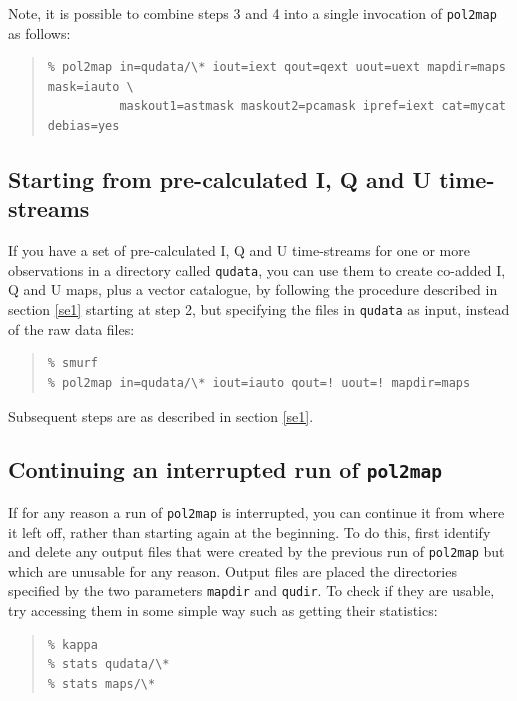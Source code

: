 \documentclass[twoside,11pt]{starlink}
\begin{document}
\begin{description}
\begin{quote}
\begin{verbatim}
\end{verbatim}
\end{quote}

Note, it is possible to combine steps 3 and 4 into a single invocation of
\texttt{pol2map} as follows:

\begin{quote}
\begin{verbatim}
% pol2map in=qudata/\* iout=iext qout=qext uout=uext mapdir=maps mask=iauto \
          maskout1=astmask maskout2=pcamask ipref=iext cat=mycat debias=yes
\end{verbatim}
\end{quote}



\end{description}

\subsection{Starting from pre-calculated I, Q and U time-streams}
If you have a set of pre-calculated I, Q and U time-streams for one or
more observations in a directory called \texttt{qudata}, you can use them
to create co-added  I, Q and U maps, plus a vector catalogue, by
following the procedure described in section \ref{se1} starting at step
2, but specifying the files in \texttt{qudata} as input, instead of the
raw data files:
\begin{quote}
\begin{verbatim}
% smurf
% pol2map in=qudata/\* iout=iauto qout=! uout=! mapdir=maps
\end{verbatim}
\end{quote}
Subsequent steps are as described in section \ref{se1}.


\subsection{Continuing an interrupted run of \texttt{pol2map}}
If for any reason a run of \texttt{pol2map} is interrupted, you can
continue it from where it left off, rather than starting again at the
beginning. To do this, first identify and delete any output files that were
created by the previous run of \texttt{pol2map} but which are unusable
for any reason. Output files are placed the directories specified by the
two parameters \texttt{mapdir} and \texttt{qudir}. To check if they are
usable, try accessing them in some simple way such as getting their
statistics:
\begin{quote}
\begin{verbatim}
% kappa
% stats qudata/\*
% stats maps/\*
\end{verbatim}
\end{quote}
\end{document}
